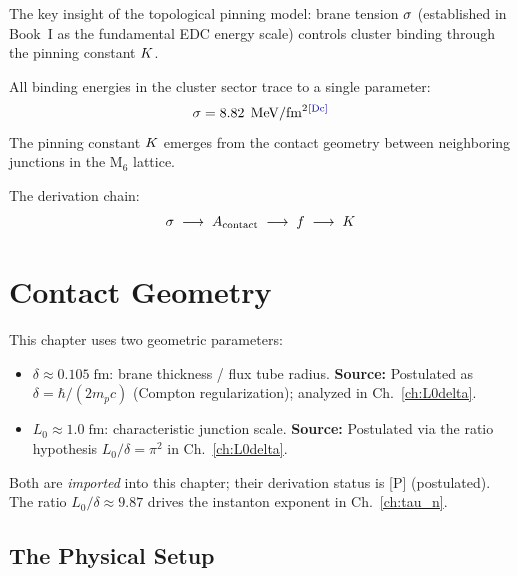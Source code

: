 The key insight of the topological pinning model: brane tension $\sigma$
(established in Book~I as the fundamental EDC energy scale) controls
cluster binding through the pinning constant $K$.

\begin{derivationbox}[title=Central Claim]
    All binding energies in the cluster sector trace to a single parameter:
    \begin{equation}
        \bsigma = 8.82\;\MeV/\text{fm}^2 \tagDc
    \end{equation}
    The pinning constant $K$ emerges from the contact geometry between
    neighboring junctions in the M$_6$ lattice.
\end{derivationbox}

The derivation chain:
\begin{equation}
    \sigma \;\longrightarrow\; A_{\text{contact}} \;\longrightarrow\; f \;\longrightarrow\; K
\end{equation}

\section{Contact Geometry}
\label{sec:sigmaK:contact}

\begin{tcolorbox}[colback=gray!5,colframe=gray!50!black,title=Notation: Length Scales $\delta$ and $L_0$]
This chapter uses two geometric parameters:
\begin{itemize}
    \item $\delta \approx 0.105\;\text{fm}$: brane thickness / flux tube radius.
          \textbf{Source:} Postulated as $\delta = \hbar/(2 m_p c)$ (Compton regularization);
          analyzed in Ch.~\ref{ch:L0delta}. \tagP
    \item $L_0 \approx 1.0\;\text{fm}$: characteristic junction scale.
          \textbf{Source:} Postulated via the ratio hypothesis $L_0/\delta = \pi^2$
          in Ch.~\ref{ch:L0delta}. \tagP
\end{itemize}
Both are \emph{imported} into this chapter; their derivation status is [P] (postulated).
The ratio $L_0/\delta \approx 9.87$ drives the instanton exponent in Ch.~\ref{ch:tau_n}.
\end{tcolorbox}

\subsection{The Physical Setup}

